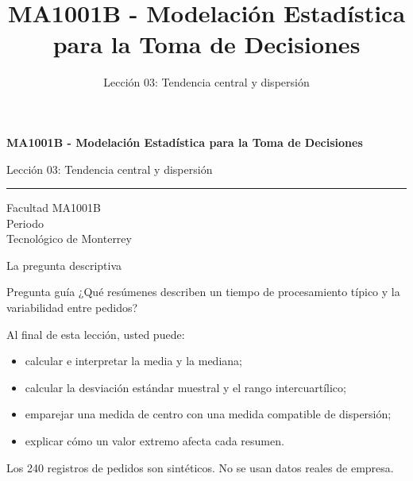 \documentclass[aspectratio=169,10pt,spanish]{beamer}
\title{MA1001B - Modelación Estadística para la Toma de Decisiones}
\subtitle{Lección 03: Tendencia central y dispersión}
\author{}
\institute{Tecnol\'ogico de Monterrey}
\date{}
\begin{document}
\begin{frame}[plain]
  \vspace{1.2cm}
  {\Large\bfseries MA1001B - Modelación Estadística para la Toma de Decisiones\par}
  \vspace{0.7cm}
  {\large Lección 03: Tendencia central y dispersión\par}
  \vspace{0.7cm}
  {\color{TecRojo}\rule{\textwidth}{1.2pt}}
  \vspace{0.8cm}

  Facultad MA1001B\\[0.3cm]
  Periodo\\[0.3cm]
  Tecnol\'ogico de Monterrey
\end{frame}

\begin{frame}{La pregunta descriptiva}
  \begin{alertblock}{Pregunta guía}
    ¿Qué resúmenes describen un tiempo de procesamiento típico y la
    variabilidad entre pedidos?
  \end{alertblock}

  \vspace{0.5em}
  Al final de esta lección, usted puede:
  \begin{itemize}
    \item calcular e interpretar la media y la mediana;
    \item calcular la desviación estándar muestral y el rango intercuartílico;
    \item emparejar una medida de centro con una medida compatible de
      dispersión;
    \item explicar cómo un valor extremo afecta cada resumen.
  \end{itemize}

  \vfill
  \scriptsize Los 240 registros de pedidos son sintéticos. No se usan datos reales de empresa.
\end{frame}
\end{document}
